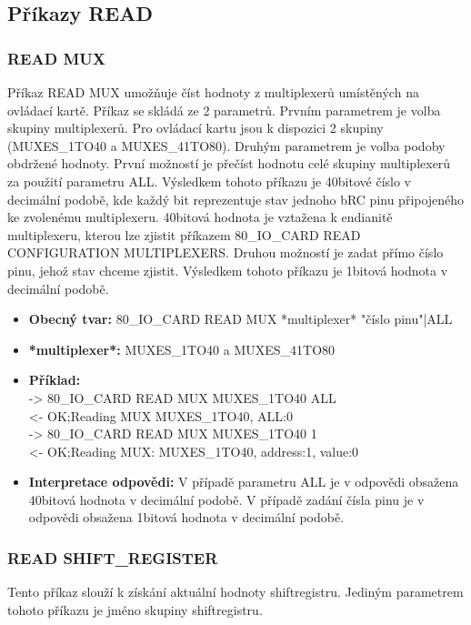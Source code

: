 \subsection{Příkazy READ}
\subsubsection{READ MUX}
Příkaz READ MUX umožňuje číst hodnoty z multiplexerů umístěných na ovládací kartě. Příkaz se skládá ze 2 parametrů. Prvním parametrem je volba
skupiny multiplexerů. Pro ovládací kartu jsou k dispozici 2 skupiny (MUXES\_1TO40 a MUXES\_41TO80). Druhým parametrem je volba podoby obdržené hodnoty.
První možností je přečíst hodnotu celé skupiny multiplexerů za použití parametru ALL. Výsledkem tohoto příkazu je 40bitové číslo v decimální podobě,
kde každý bit reprezentuje stav jednoho bRC pinu připojeného ke zvolenému multiplexeru.
40bitová hodnota je vztažena k endianitě multiplexeru, kterou lze zjistit
příkazem 80\_IO\_CARD READ CONFIGURATION MULTIPLEXERS.
Druhou možností je zadat přímo číslo pinu, jehož stav chceme zjistit. Výsledkem tohoto příkazu je 1bitová hodnota v decimální podobě.
\begin{itemize}[leftmargin=*]
    \item \textbf{Obecný tvar:} 80\_IO\_CARD READ MUX *multiplexer* "číslo pinu"|ALL
    \item \textbf{*multiplexer*:} MUXES\_1TO40 a MUXES\_41TO80
    \item \textbf{Příklad:}\\
    -> 80\_IO\_CARD READ MUX MUXES\_1TO40 ALL\\
    <- OK;Reading MUX MUXES\_1TO40, ALL:0\\
    -> 80\_IO\_CARD READ MUX MUXES\_1TO40 1\\
    <- OK;Reading MUX: MUXES\_1TO40, address:1, value:0
    \item \textbf{Interpretace odpovědi:} V případě parametru ALL je v odpovědi obsažena 40bitová hodnota v decimální podobě.
    V případě zadání čísla pinu je v odpovědi obsažena 1bitová hodnota v decimální podobě.
\end{itemize}

\subsubsection{READ SHIFT\_REGISTER}
Tento příkaz slouží k získání aktuální hodnoty shiftregistru. Jediným parametrem tohoto příkazu je jméno skupiny shiftregistru.

